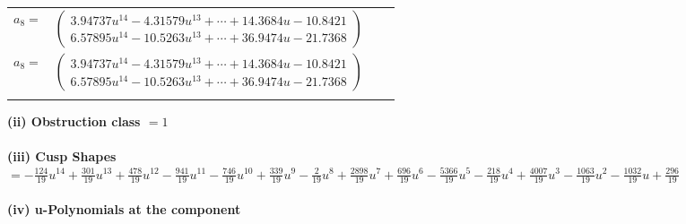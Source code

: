 \documentclass[1p]{elsarticle_modified}
\theoremstyle{definition}
\begin{document}
\begin{tabular}{m{7pt} m{180pt} m{7pt} m{180pt} }
\flushright $a_{8}=$&$\begin{pmatrix}3.94737 u^{14}-4.31579 u^{13}+\cdots+14.3684 u-10.8421\\6.57895 u^{14}-10.5263 u^{13}+\cdots+36.9474 u-21.7368\end{pmatrix}$\\ \flushright $a_{8}=$&$\begin{pmatrix}3.94737 u^{14}-4.31579 u^{13}+\cdots+14.3684 u-10.8421\\6.57895 u^{14}-10.5263 u^{13}+\cdots+36.9474 u-21.7368\end{pmatrix}$\\&\end{tabular}
\flushleft \textbf{(ii) Obstruction class $= 1$}\\~\\
\flushleft \textbf{(iii) Cusp Shapes $= -\frac{124}{19} u^{14}+\frac{301}{19} u^{13}+\frac{478}{19} u^{12}-\frac{941}{19} u^{11}-\frac{746}{19} u^{10}+\frac{339}{19} u^9-\frac{2}{19} u^8+\frac{2898}{19} u^7+\frac{696}{19} u^6-\frac{5366}{19} u^5-\frac{218}{19} u^4+\frac{4007}{19} u^3-\frac{1063}{19} u^2-\frac{1032}{19} u+\frac{296}{19}$}\\~\\
\newpage\renewcommand{\arraystretch}{1}
\flushleft \textbf{(iv) u-Polynomials at the component}\newline \\
\end{document}
